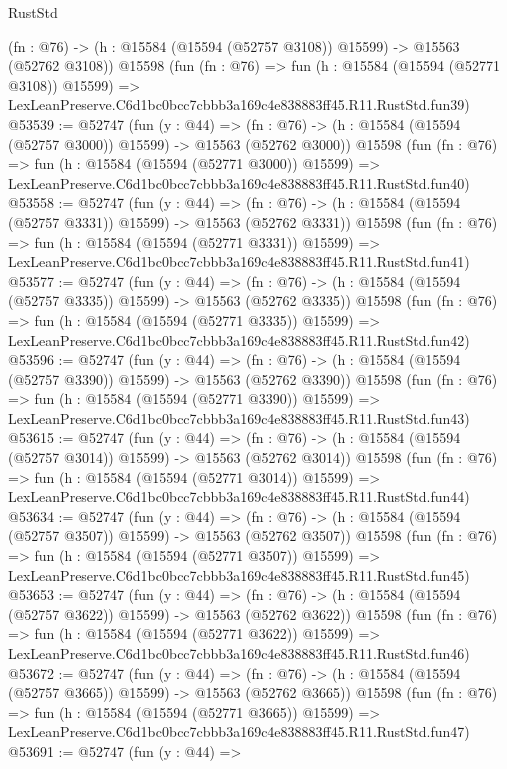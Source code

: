 \begin{lexlean}{RustStd}
\begin{coremodule}
    (fn : @76) -> (h : @15584 (@15594 (@52757 @3108)) @15599) -> @15563 (@52762 @3108))
    @15598
    (fun (fn : @76) =>
    fun (h : @15584 (@15594 (@52771 @3108)) @15599) =>
    LexLeanPreserve.C6d1bc0bcc7cbbb3a169c4e838883ff45.R11.RustStd.fun39)
@53539 := @52747
    (fun (y : @44) =>
    (fn : @76) -> (h : @15584 (@15594 (@52757 @3000)) @15599) -> @15563 (@52762 @3000))
    @15598
    (fun (fn : @76) =>
    fun (h : @15584 (@15594 (@52771 @3000)) @15599) =>
    LexLeanPreserve.C6d1bc0bcc7cbbb3a169c4e838883ff45.R11.RustStd.fun40)
@53558 := @52747
    (fun (y : @44) =>
    (fn : @76) -> (h : @15584 (@15594 (@52757 @3331)) @15599) -> @15563 (@52762 @3331))
    @15598
    (fun (fn : @76) =>
    fun (h : @15584 (@15594 (@52771 @3331)) @15599) =>
    LexLeanPreserve.C6d1bc0bcc7cbbb3a169c4e838883ff45.R11.RustStd.fun41)
@53577 := @52747
    (fun (y : @44) =>
    (fn : @76) -> (h : @15584 (@15594 (@52757 @3335)) @15599) -> @15563 (@52762 @3335))
    @15598
    (fun (fn : @76) =>
    fun (h : @15584 (@15594 (@52771 @3335)) @15599) =>
    LexLeanPreserve.C6d1bc0bcc7cbbb3a169c4e838883ff45.R11.RustStd.fun42)
@53596 := @52747
    (fun (y : @44) =>
    (fn : @76) -> (h : @15584 (@15594 (@52757 @3390)) @15599) -> @15563 (@52762 @3390))
    @15598
    (fun (fn : @76) =>
    fun (h : @15584 (@15594 (@52771 @3390)) @15599) =>
    LexLeanPreserve.C6d1bc0bcc7cbbb3a169c4e838883ff45.R11.RustStd.fun43)
@53615 := @52747
    (fun (y : @44) =>
    (fn : @76) -> (h : @15584 (@15594 (@52757 @3014)) @15599) -> @15563 (@52762 @3014))
    @15598
    (fun (fn : @76) =>
    fun (h : @15584 (@15594 (@52771 @3014)) @15599) =>
    LexLeanPreserve.C6d1bc0bcc7cbbb3a169c4e838883ff45.R11.RustStd.fun44)
@53634 := @52747
    (fun (y : @44) =>
    (fn : @76) -> (h : @15584 (@15594 (@52757 @3507)) @15599) -> @15563 (@52762 @3507))
    @15598
    (fun (fn : @76) =>
    fun (h : @15584 (@15594 (@52771 @3507)) @15599) =>
    LexLeanPreserve.C6d1bc0bcc7cbbb3a169c4e838883ff45.R11.RustStd.fun45)
@53653 := @52747
    (fun (y : @44) =>
    (fn : @76) -> (h : @15584 (@15594 (@52757 @3622)) @15599) -> @15563 (@52762 @3622))
    @15598
    (fun (fn : @76) =>
    fun (h : @15584 (@15594 (@52771 @3622)) @15599) =>
    LexLeanPreserve.C6d1bc0bcc7cbbb3a169c4e838883ff45.R11.RustStd.fun46)
@53672 := @52747
    (fun (y : @44) =>
    (fn : @76) -> (h : @15584 (@15594 (@52757 @3665)) @15599) -> @15563 (@52762 @3665))
    @15598
    (fun (fn : @76) =>
    fun (h : @15584 (@15594 (@52771 @3665)) @15599) =>
    LexLeanPreserve.C6d1bc0bcc7cbbb3a169c4e838883ff45.R11.RustStd.fun47)
@53691 := @52747
    (fun (y : @44) =>

\end{coremodule}
\end{lexlean}
